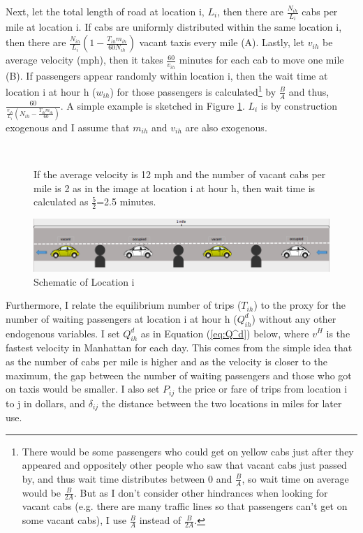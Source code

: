 Next, let the total length of road at location i, $L_i$, then there are $\frac{N_{ih}}{L_i}$ cabs per mile at location i. If cabs are uniformly distributed within the same location i, then there are $\frac{N_{ih}}{L_i}(1-\frac{T_{ih}m_{ih}}{60N_{ih}})$ vacant taxis every mile (A). Lastly, let $v_{ih}$ be average velocity (mph), then it takes $\frac{60}{v_{ih}}$ minutes for each cab to move one mile (B). If passengers appear randomly within location i, then the wait time at location i at hour h ($w_{ih}$) for those passengers is calculated\footnote{There would be some passengers who could get on yellow cabs just after they appeared and oppositely other people who saw that vacant cabs just passed by, and thus wait time distributes between 0 and $\frac{B}{A}$, so wait time on average would be $\frac{B}{2A}$. But as I don't consider other hindrances when looking for vacant cabs (e.g. there are many traffic lines so that passengers can't get on some vacant cabs), I use $\frac{B}{A}$ instead of $\frac{B}{2A}$.} by $\frac{B}{A}$ and thus, $\frac{60}{\frac{v_{ih}}{L_i}(N_{ih}-\frac{T_{ih}m_{ih}}{60})}$. A simple example is sketched in Figure \ref{fig:taxi_picture}. $L_i$ is by construction exogenous and I assume that $m_{ih}$ and $v_{ih}$ are also exogenous.

\begin{figure}[h]
\begin{center}
\caption{Schematic of Location i}\label{fig:taxi_picture}\\
\end{center}
{\footnotesize \noindent If the average velocity is 12 mph and the number of vacant cabs per mile is 2 as in the image at location i at hour h, then wait time is calculated as $\frac{5}{2}$=2.5 minutes.}
\begin{center}
\includegraphics[width=16.5cm]{Figures/taxi_picture.png}
\end{center}
\end{figure}

Furthermore, I relate the equilibrium number of trips ($T_{ih}$) to the proxy for the number of waiting passengers at location i at hour h ($Q^d_{ih}$) without any other endogenous variables. I set $Q^d_{ih}$ as in Equation (\ref{eq:Q^d}) below, where $v^H$ is the fastest velocity in Manhattan for each day. This comes from the simple idea that as the number of cabs per mile is higher and as the velocity is closer to the maximum, the gap between the number of waiting passengers and those who got on taxis would be smaller. I also set $P_{ij}$ the price or fare of trips from location i to j in dollars, and $\delta_{ij}$ the distance between the two locations in miles for later use.

